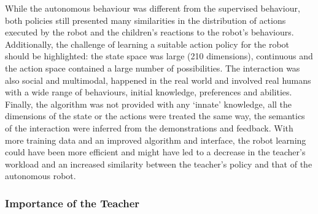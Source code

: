 While the autonomous behaviour was different from the supervised behaviour, both policies still presented many similarities in the distribution of actions executed by the robot and the children's reactions to the robot's behaviours. Additionally, the challenge of learning a suitable action policy for the robot should be highlighted: the state space was large (210 dimensions), continuous and the action space contained a large number of possibilities. The interaction was also social and multimodal, happened in the real world and involved real humans with a wide range of behaviours, initial knowledge, preferences and abilities. Finally, the algorithm was not provided with any `innate' knowledge, all the dimensions of the state or the actions were treated the same way, the semantics of the interaction were inferred from the demonstrations and feedback. With more training data and an improved algorithm and interface, the robot learning could have been more efficient and might have led to a decrease in the teacher's workload and an increased similarity between the teacher's policy and that of the autonomous robot. 

\subsubsection{Importance of the Teacher}

